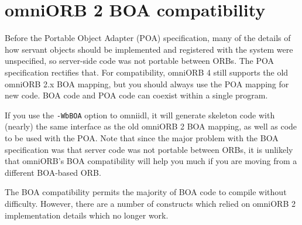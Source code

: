\documentclass[11pt,twoside,a4paper]{book}
\newcommand{\cmdline}[1]{\texttt{#1}}
\begin{document}
\section{omniORB 2 BOA compatibility}
\label{sec:BOAcompat}

Before the Portable Object Adapter (POA) specification, many of the
details of how servant objects should be implemented and registered
with the system were unspecified, so server-side code was not portable
between ORBs. The POA specification rectifies that. For compatibility,
omniORB 4 still supports the old omniORB 2.x BOA mapping, but you
should always use the POA mapping for new code. BOA code and POA code
can coexist within a single program. 

If you use the \cmdline{-WbBOA} option to omniidl, it will generate
skeleton code with (nearly) the same interface as the old omniORB 2
BOA mapping, as well as code to be used with the POA. Note that since
the major problem with the BOA specification was that server code was
not portable between ORBs, it is unlikely that omniORB's BOA
compatibility will help you much if you are moving from a different
BOA-based ORB.

The BOA compatibility permits the majority of BOA code to compile
without difficulty. However, there are a number of constructs which
relied on omniORB 2 implementation details which no longer work.
\end{document}
